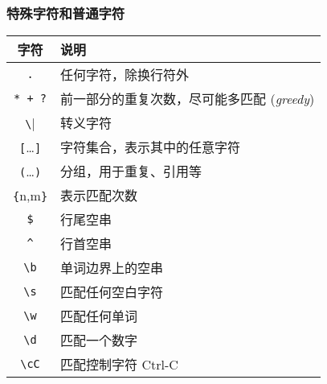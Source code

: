 \begin{frame}[fragile]
\frametitle{特殊字符和普通字符}
\begin{tabular}{c|l}
\hline
字符                  & 说明                                               \\
\hline
\verb|.|              & 任何字符，除换行符外                               \\
\verb|* + ?|          & 前一部分的重复次数，尽可能多匹配 (\textit{greedy}) \\
\verb|\|              & 转义字符                                           \\
\verb|[|\dots\verb|]| & 字符集合，表示其中的任意字符                       \\
\verb|(|\dots\verb|)| & 分组，用于重复、引用等                             \\
\verb|{|n,m\verb|}|   & 表示匹配次数                                       \\
\verb|$|              & 行尾空串                                           \\
\verb|^|              & 行首空串                                           \\
\hline
\verb|\b|             & 单词边界上的空串                                   \\
\verb|\s|             & 匹配任何空白字符                                   \\
\verb|\w|             & 匹配任何单词                                       \\
\verb|\d|             & 匹配一个数字                                       \\
\verb|\cC|            & 匹配控制字符 Ctrl-C                               \\
\hline
\end{tabular}
\end{frame}

